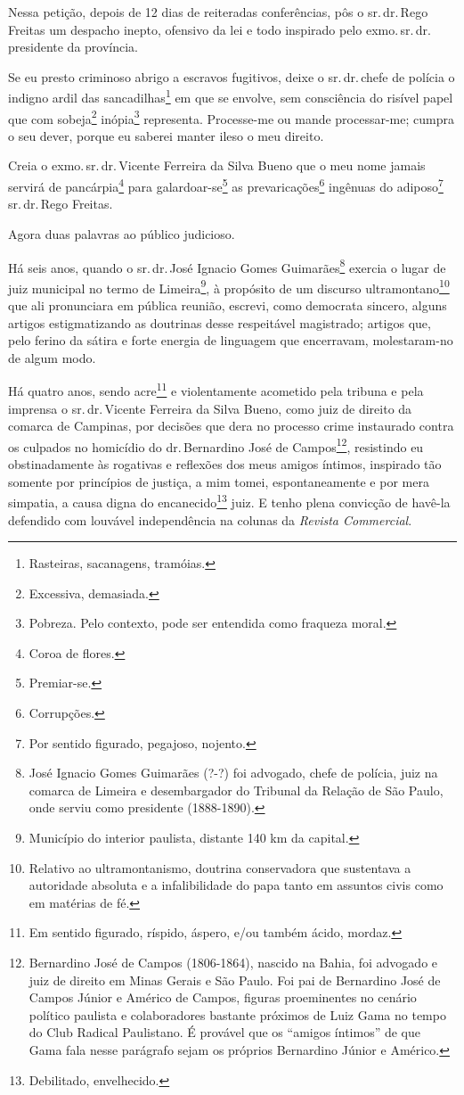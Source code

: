 Nessa petição, depois de 12 dias de reiteradas conferências, pôs o sr.\,dr.\,Rego Freitas um despacho inepto, ofensivo da lei e todo inspirado
pelo exmo.\,sr.\,dr.\,presidente da província.

Se eu presto criminoso abrigo a escravos fugitivos, deixe o sr.\,dr.\,chefe de polícia o indigno ardil das sancadilhas\footnote{Rasteiras,
  sacanagens, tramóias.} em que se envolve, sem consciência do risível
papel que com sobeja\footnote{Excessiva, demasiada.} inópia\footnote{
  Pobreza. Pelo contexto, pode ser entendida como fraqueza moral.}
representa. Processe-me ou mande processar-me; cumpra o seu dever,
porque eu saberei manter ileso o meu direito.

Creia o exmo.\,sr.\,dr.\,Vicente Ferreira da Silva Bueno que o meu nome
jamais servirá de pancárpia\footnote{Coroa de flores.} para
galardoar-se\footnote{Premiar-se.} as prevaricações\footnote{
  Corrupções.} ingênuas do adiposo\footnote{Por sentido figurado,
  pegajoso, nojento.} sr.\,dr.\,Rego Freitas.

Agora duas palavras ao público judicioso.

Há seis anos, quando o sr.\,dr.\,José Ignacio Gomes Guimarães\footnote{
  José Ignacio Gomes Guimarães (?-?) foi advogado, chefe de polícia,
  juiz na comarca de Limeira e desembargador do Tribunal da Relação de
  São Paulo, onde serviu como presidente (1888-1890).} exercia o lugar
de juiz municipal no termo de Limeira\footnote{Município do interior
  paulista, distante 140 km da capital.}, à propósito de um discurso
ultramontano\footnote{Relativo ao ultramontanismo, doutrina
  conservadora que sustentava a autoridade absoluta e a infalibilidade
  do papa tanto em assuntos civis como em matérias de fé.} que ali
pronunciara em pública reunião, escrevi, como democrata sincero, alguns
artigos estigmatizando as doutrinas desse respeitável magistrado;
artigos que, pelo ferino da sátira e forte energia de linguagem que
encerravam, molestaram-no de algum modo.

Há quatro anos, sendo acre\footnote{Em sentido figurado, ríspido,
  áspero, e/ou também ácido, mordaz.} e violentamente acometido pela
tribuna e pela imprensa o sr.\,dr.\,Vicente Ferreira da Silva Bueno, como
juiz de direito da comarca de Campinas, por decisões que dera no
processo crime instaurado contra os culpados no homicídio do dr.\,Bernardino José de Campos\footnote{Bernardino José de Campos
  (1806-1864), nascido na Bahia, foi advogado e juiz de direito em Minas
  Gerais e São Paulo. Foi pai de Bernardino José de Campos Júnior e
  Américo de Campos, figuras proeminentes no cenário político paulista e
  colaboradores bastante próximos de Luiz Gama no tempo do Club Radical
  Paulistano. É provável que os ``amigos íntimos'' de que Gama fala nesse
  parágrafo sejam os próprios Bernardino Júnior e Américo.}, resistindo
eu obstinadamente às rogativas e reflexões dos meus amigos íntimos,
inspirado tão somente por princípios de justiça, a mim tomei,
espontaneamente e por mera simpatia, a causa digna do
encanecido\footnote{Debilitado, envelhecido.} juiz. E tenho plena
convicção de havê-la defendido com louvável independência na colunas da
\emph{Revista Commercial}.

